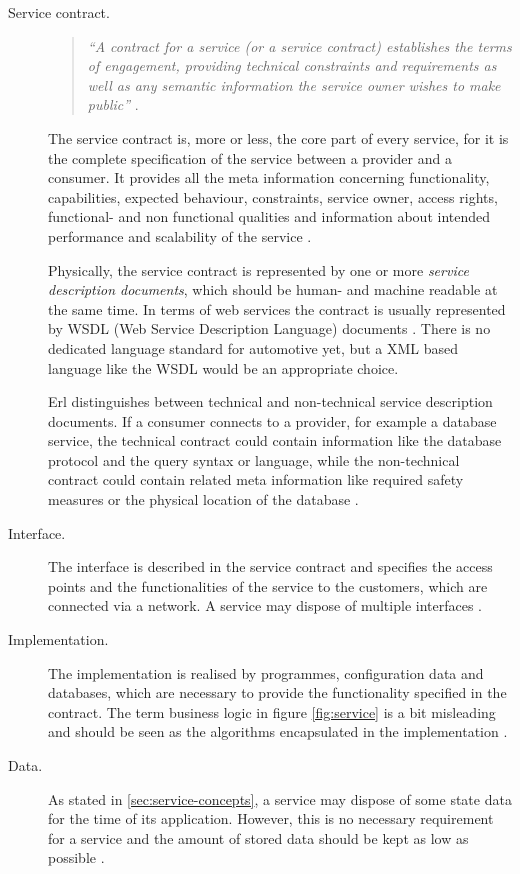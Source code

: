\begin{description}
\item [Service contract.] 
\begin{quote}
\emph{``A contract for a service (or a service contract) establishes the terms of engagement, providing technical constraints and requirements as well as any semantic information the service owner wishes to make public''} 
\cite[ch.6.1]{erl2008}.
\end{quote}
The service contract is, more or less, the core part of every service, for it is the complete specification of the service between a provider and a consumer. It provides all the meta information concerning functionality, capabilities, expected behaviour, constraints, service owner, access rights, functional- and non functional qualities and information about intended performance and scalability of the service \cite[p.44]{krafzig} \cite[p.26]{josuttis} \cite{breivold}.

Physically, the service contract is represented by one or more \emph{service description documents}, which should be human- and machine readable at the same time. In terms of web services the contract is usually represented by WSDL (Web Service Description Language) documents \cite[p.43]{erl2011}. There is no dedicated language standard for automotive yet, but a XML based language like the WSDL would be an appropriate choice.

Erl \cite{erl2008} distinguishes between technical and non-technical service description documents. If a consumer connects to a provider, for example a database service, the technical contract could contain information like the database protocol and the query syntax or language, while the non-technical contract could contain related meta information like required safety measures or the physical location of the database \cite[ch.6.1]{erl2008}.

\item [Interface.] 
The interface is described in the service contract and specifies the access points and the functionalities of the service to the customers, which are connected via a network. A service may dispose of multiple interfaces \cite[p.44]{krafzig} \cite{breivold}.

\item [Implementation.] 
The implementation is realised by programmes, configuration data and databases, which are necessary to provide the functionality specified in the contract. The term business logic in figure \ref{fig:service} is a bit misleading and should be seen as the algorithms encapsulated in the implementation \cite[p.44]{krafzig}.

\item [Data.]
As stated in \ref{sec:service-concepts}, a service may dispose of some state data for the time of its application. However, this is no necessary requirement for a service and the amount of stored data should be kept as low as possible \cite[p.44]{krafzig}.
\end{description}

